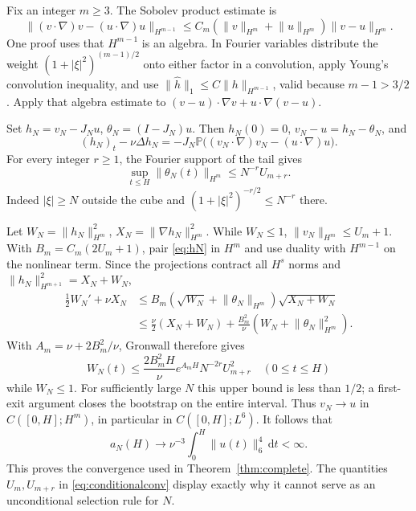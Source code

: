 \documentclass[11pt,a4paper]{article}
\theoremstyle{definition}\newtheorem{definition}[theorem]{Definition}
\theoremstyle{remark}\newtheorem{remark}[theorem]{Remark}
\newcommand{\PP}{\mathbb P}
\newcommand{\dd}{\,\mathrm d}
\newcommand{\norm}[1]{\lVert #1\rVert}
\numberwithin{equation}{section}
\begin{document}
Fix an integer $m\ge3$. The Sobolev product estimate is
\begin{equation}\label{eq:productHm}
 \norm{(v\cdot\nabla)v-(u\cdot\nabla)u}_{H^{m-1}}
 \le C_m(\norm v_{H^m}+\norm u_{H^m})\norm{v-u}_{H^m}.
\end{equation}
One proof uses that $H^{m-1}$ is an algebra. In Fourier variables distribute the weight $(1+|\xi|^2)^{(m-1)/2}$ onto either factor in a convolution, apply Young's convolution inequality, and use
$\norm{\widehat h}_1\le C\norm h_{H^{m-1}}$, valid because $m-1>3/2$. Apply that algebra estimate to $(v-u)\cdot\nabla v+u\cdot\nabla(v-u)$.

Set $h_N=v_N-J_Nu$, $\theta_N=(I-J_N)u$. Then $h_N(0)=0$, $v_N-u=h_N-\theta_N$, and
\begin{equation}\label{eq:hN}
 (h_N)_t-\nu\Delta h_N
 =-J_N\PP\bigl((v_N\cdot\nabla)v_N-(u\cdot\nabla)u\bigr).
\end{equation}
For every integer $r\ge1$, the Fourier support of the tail gives
\begin{equation}\label{eq:thetaN}
 \sup_{t\le H}\norm{\theta_N(t)}_{H^m}\le N^{-r}U_{m+r}.
\end{equation}
Indeed $|\xi|\ge N$ outside the cube and $(1+|\xi|^2)^{-r/2}\le N^{-r}$ there.

Let $W_N=\norm{h_N}_{H^m}^2$, $X_N=\norm{\nabla h_N}_{H^m}^2$. While $W_N\le1$, $\norm{v_N}_{H^m}\le U_m+1$. With $B_m=C_m(2U_m+1)$, pair \eqref{eq:hN} in $H^m$ and use duality with $H^{m-1}$ on the nonlinear term. Since the projections contract all $H^s$ norms and
$\norm{h_N}_{H^{m+1}}^2=X_N+W_N$,
\begin{align*}
 \tfrac12W_N'+\nu X_N
 &\le B_m(\sqrt{W_N}+\norm{\theta_N}_{H^m})\sqrt{X_N+W_N}\\
 &\le\tfrac\nu2(X_N+W_N)
      +\frac{B_m^2}{\nu}(W_N+\norm{\theta_N}_{H^m}^2).
\end{align*}
With $A_m=\nu+2B_m^2/\nu$, Gronwall therefore gives
\begin{equation}\label{eq:conditionalconv}
 W_N(t)\le\frac{2B_m^2H}{\nu}e^{A_mH}N^{-2r}U_{m+r}^2
 \quad(0\le t\le H)
\end{equation}
while $W_N\le1$. For sufficiently large $N$ this upper bound is less than $1/2$; a first-exit argument closes the bootstrap on the entire interval. Thus $v_N\to u$ in $C([0,H];H^m)$, in particular in $C([0,H];L^6)$. It follows that
\[
 a_N(H)\longrightarrow\nu^{-3}\int_0^H\norm{u(t)}_6^4\dd t<\infty.
\]
This proves the convergence used in Theorem~\ref{thm:complete}. The quantities $U_m,U_{m+r}$ in \eqref{eq:conditionalconv} display exactly why it cannot serve as an unconditional selection rule for $N$.
\end{document}
